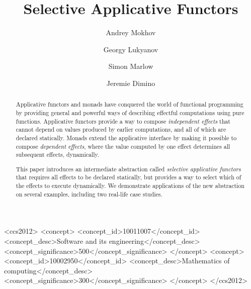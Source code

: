 \documentclass[acmsmall,screen]{acmart}
\begin{document}
\title{Selective Applicative Functors}


\author{Andrey Mokhov}
\author{Georgy Lukyanov}
\author{Simon Marlow}
\author{Jeremie Dimino}


\begin{abstract}
Applicative functors and monads have conquered the world of functional
programming by providing general and powerful ways of describing effectful
computations using pure functions. Applicative functors provide a way to compose
\emph{independent effects} that cannot depend on values produced by earlier
computations, and all of which are declared statically. Monads extend the
applicative interface by making it possible to compose \emph{dependent effects},
where the value computed by one effect determines all subsequent effects,
dynamically.

This paper introduces an intermediate abstraction called \emph{selective
applicative functors} that requires all effects to be declared statically, but
provides a way to select which of the effects to execute dynamically. We
demonstrate applications of the new abstraction on several examples, including
two real-life case studies.
\end{abstract}

\begin{CCSXML}
<ccs2012>
<concept>
<concept_id>10011007</concept_id>
 <concept_desc>Software and its engineering</concept_desc>
<concept_significance>500</concept_significance>
</concept>
<concept>
<concept_id>10002950</concept_id>
 <concept_desc>Mathematics of computing</concept_desc>
<concept_significance>300</concept_significance>
</concept>
</ccs2012>
\end{CCSXML}
\end{document}
